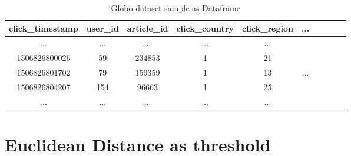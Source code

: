 \documentclass[ecp,tc,english]{iiufrgs}
\begin{document}
    \begin{table}[!ht]
        \centering
        \begin{tabular}{ |c|c|c|c|c|c|c|c|c|c| } 
            \hline
            click\_timestamp & user\_id & article\_id & click\_country & click\_region & ... \\
            \hline 
            ... & ...  & ...  & ...  & ... & \\
            1506826800026 & 59 & 234853 & 1 & 21 & \\ 
            1506826801702 & 79 & 159359 & 1 & 13 & ...\\ 
            1506826804207 & 154 & 96663 & 1 & 25 & \\ 
            ... & ...  & ...  & ...  & ... & \\
            \hline
        \end{tabular}
        \caption{Globo dataset sample as Dataframe}
        \label{tab:my_label}
    \end{table}

    \section{Euclidean Distance as threshold}
\end{document}
